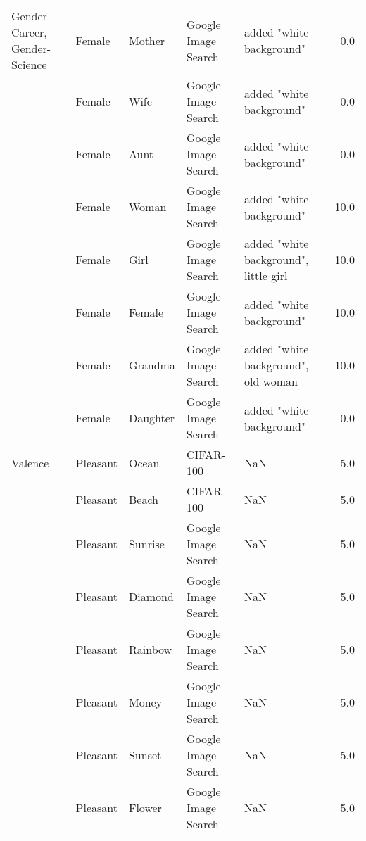 \begin{tabular}{lllllr}
Gender-Career, Gender-Science & Female &           Mother &  Google Image Search &                           added "white background" &   0.0 \\
          & Female &             Wife &  Google Image Search &                           added "white background" &   0.0 \\
          & Female &             Aunt &  Google Image Search &                           added "white background" &   0.0 \\
          & Female &            Woman &  Google Image Search &                           added "white background" &  10.0 \\
          & Female &             Girl &  Google Image Search &              added "white background", little girl &  10.0 \\
          & Female &           Female &  Google Image Search &                           added "white background" &  10.0 \\
          & Female &          Grandma &  Google Image Search &                added "white background", old woman &  10.0 \\
          & Female &         Daughter &  Google Image Search &                           added "white background" &   0.0 \\
Valence & Pleasant &            Ocean &            CIFAR-100 &                                                NaN &   5.0 \\
          & Pleasant &            Beach &            CIFAR-100 &                                                NaN &   5.0 \\
          & Pleasant &          Sunrise &  Google Image Search &                                                NaN &   5.0 \\
          & Pleasant &          Diamond &  Google Image Search &                                                NaN &   5.0 \\
          & Pleasant &          Rainbow &  Google Image Search &                                                NaN &   5.0 \\
          & Pleasant &            Money &  Google Image Search &                                                NaN &   5.0 \\
          & Pleasant &           Sunset &  Google Image Search &                                                NaN &   5.0 \\
          & Pleasant &           Flower &  Google Image Search &                                                NaN &   5.0 \\

\end{tabular}
